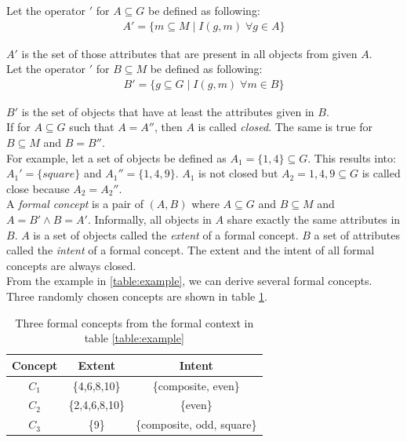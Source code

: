 \documentclass[11pt]{report}
\begin{document}
Let the operator $'$ for $A \subseteq G$ be defined as following:
\begin{align*}
	A' = \{ m \subseteq M\; |\;  I(g, m)\;   \forall g \in A\}
\end{align*}

$A'$ is the set of those attributes that are present in all objects from given $A$. \\

Let the operator $'$ for $B \subseteq M$ be defined as following:
\begin{align*}
	B' = \{ g \subseteq G\; |\;  I(g, m)\;   \forall m \in B\}
\end{align*}

$B'$ is the set of objects that have at least the attributes given in $B$. \\

If for $A \subseteq G$ such that $A = A''$, then $A$ is called \textit{closed}. The same is true for $B \subseteq M$ and $B = B''$. \\

For example, let a set of objects be defined as $A_1 = \{1,4\} \subseteq G$. This results into: $A_1' = \{square\}$ and $A_1'' = \{1,4,9\}$. $A_1$ is not closed but $A_2 = {1,4,9} \subseteq G$ is called close because $A_2 = A_2''$. \\   

A \textit{formal concept} is a pair of $(A, B)$ where $A \subseteq G$ and $B \subseteq M$ and $A = B' \wedge B = A' $. Informally, all objects in $A$ share exactly the same attributes in $B$. $A$ is a set of objects called the \textit{extent} of a formal concept. $B$ a set of attributes called the \textit{intent} of a formal concept. The extent and the intent of all formal concepts are always closed.\\

From the example in \ref{table:example}, we can derive several formal concepts. Three randomly chosen concepts are shown in table \ref{table:exampleConcepts}. \\

\begin{table}[h]
\caption{Three formal concepts from the formal context in table \ref{table:example}}
\label{table:exampleConcepts}
\centering

\def\arraystretch{1.2}%
\begin{tabular}{ c c c }
\hline
 Concept & Extent & Intent \\
\hline

$C_1$ & \{4,6,8,10\} & \{composite, even\} \\
$C_2$ & \{2,4,6,8,10\} & \{even\} \\
$C_3$ & \{9\} & \{composite, odd, square\} \\

\hline
\end{tabular}
\end{table}
\end{document}
